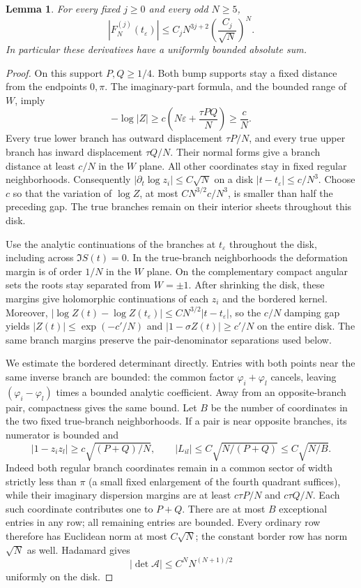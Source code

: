 \documentclass[11pt]{article}
\numberwithin{equation}{section}
\newtheorem{lemma}[theorem]{Lemma}
\theoremstyle{remark}\newtheorem{remark}[theorem]{Remark}
\begin{document}
\begin{lemma}\label{lem:constrained-selected}
For every fixed $j\ge0$ and every odd $N\ge5$,
\[
 |F_N^{(j)}(t_\varepsilon)|
    \le C_j N^{3j+2}\left(\frac{C_j}{\sqrt N}\right)^N.
\]
In particular these derivatives have a uniformly bounded absolute sum.
\end{lemma}
\begin{proof}
On this support $P,Q\ge1/4$.  Both bump supports stay a fixed
distance from the endpoints $0,\pi$.  The imaginary-part formula,
and the bounded range of $W$, imply
\[
 -\log|Z|\ge c\left(N\varepsilon+\frac{\tau PQ}{N}\right)
             \ge \frac cN.
\]
Every true lower branch has outward displacement $\tau P/N$,
and every true upper branch has inward displacement $\tau Q/N$.
Their normal forms give a branch distance at least $c/N$ in
the $W$ plane. All other coordinates stay in fixed regular
neighborhoods. Consequently $|\partial_t\log z_i|\le C\sqrt N$
on a disk $|t-t_\varepsilon|\le c/N^3$. Choose $c$ so that the
variation of $\log Z$, at most $CN^{3/2}c/N^3$, is smaller than
half the preceding gap. The true branches remain on their interior
sheets throughout this disk.

Use the analytic continuations of the branches at $t_\varepsilon$
throughout the disk, including across $\Im S(t)=0$. In the true-branch
neighborhoods the deformation margin is of order $1/N$ in the $W$
plane. On the complementary compact angular sets the roots stay
separated from $W=\pm1$. After shrinking the disk, these margins give
holomorphic continuations of each $z_i$ and the bordered kernel.
Moreover,
$|\log Z(t)-\log Z(t_\varepsilon)|
 \le CN^{3/2}|t-t_\varepsilon|$,
so the $c/N$ damping gap yields
$|Z(t)|\le\exp(-c'/N)$ and
$|1-\sigma Z(t)|\ge c'/N$ on the entire disk.
The same branch margins preserve the pair-denominator separations
used below.

We estimate the bordered determinant directly.
Entries with both points near the same inverse branch are bounded:
the common factor $\varphi_i+\varphi_l$ cancels, leaving
$(\varphi_i-\varphi_l)$ times a bounded analytic coefficient.
Away from an opposite-branch pair, compactness gives the same bound.
Let $B$ be the number of coordinates in the two fixed true-branch
neighborhoods.  If a pair is near opposite branches, its numerator
is bounded and
\[
 |1-z_i z_l|\ge c\sqrt{(P+Q)/N},\qquad
 |L_{il}|\le C\sqrt{N/(P+Q)}\le C\sqrt{N/B}.
\]
Indeed both regular branch coordinates remain in a common sector
of width strictly less than $\pi$ (a small fixed enlargement of the
fourth quadrant suffices), while their imaginary dispersion margins are
at least $c\tau P/N$ and $c\tau Q/N$.  Each such coordinate
contributes one to $P+Q$.  There are at most $B$ exceptional
entries in any row; all remaining entries are bounded.  Every ordinary row therefore has Euclidean norm at most
$C\sqrt N$; the constant border row has norm $\sqrt N$ as well.  Hadamard gives
\[
 |\det\mathcal A|\le C^N N^{(N+1)/2}
\]
uniformly on the disk.


\end{proof}
\end{document}
